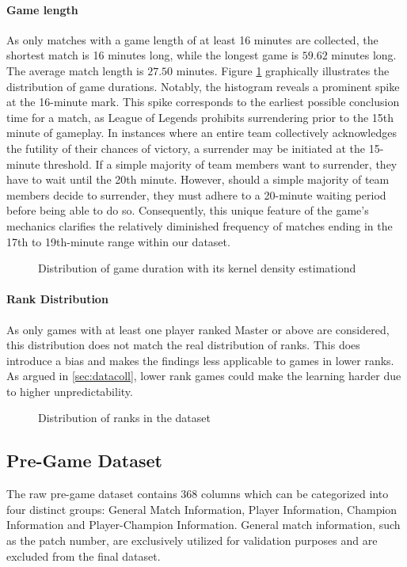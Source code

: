 \documentclass[12pt, a4paper, headinclude, twoside, plainheadsepline, open=right, numbers=noenddot, hidelinks, toc=listof, toc=bibliography]{scrreprt}
\begin{document}
\paragraph{Game length}
As only matches with a game length of at least 16 minutes are collected, the shortest match is 16 minutes long, while the longest game is $59.62$ minutes long.
The average match length is $27.50$ minutes.
Figure \ref{fig:gameDuration} graphically illustrates the distribution of game durations. 
Notably, the histogram reveals a prominent spike at the 16-minute mark.
This spike corresponds to the earliest possible conclusion time for a match, as League of Legends prohibits surrendering prior to the 15th minute of gameplay. In instances where an entire team collectively acknowledges the futility of their chances of victory, a surrender may be initiated at the 15-minute threshold.
If a simple majority of team members want to surrender, they have to wait until the 20th minute.
However, should a simple majority of team members decide to surrender, they must adhere to a 20-minute waiting period before being able to do so. 
Consequently, this unique feature of the game's mechanics clarifies the relatively diminished frequency of matches ending in the 17th to 19th-minute range within our dataset.

\begin{figure}[ht]

\caption{Distribution of game duration with its kernel density estimationd}
\label{fig:gameDuration}
\end{figure}


\paragraph{Rank Distribution}
As only games with at least one player ranked Master or above are considered, this distribution does not match the real distribution of ranks.
This does introduce a bias and makes the findings less applicable to games in lower ranks.
As argued in \ref{sec:datacoll}, lower rank games could make the learning harder due to higher unpredictability.

\begin{figure}
\centering
\resizebox{\textwidth}{!}
{

}
\caption{Distribution of ranks in the dataset}
\label{fig:tier}
\end{figure}


\subsection{Pre-Game Dataset}
\label{ssec:pre_game_data}
The raw pre-game dataset contains $368$ columns which can be categorized into four distinct groups: General Match Information, Player Information, Champion Information and Player-Champion Information.
General match information, such as the patch number, are exclusively utilized for validation purposes and are excluded from the final dataset.
\end{document}
